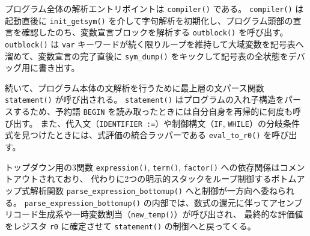 \documentclass[11pt,a4paper,dvipdfmx]{bxjsarticle}
\begin{document}
プログラム全体の解析エントリポイントは \texttt{compiler()} である。
\texttt{compiler()} は起動直後に \texttt{init\_getsym()} を介して字句解析を初期化し、プログラム頭部の宣言を確認したのち、変数宣言ブロックを解析する \texttt{outblock()} を呼び出す。
\texttt{outblock()} は \texttt{var} キーワードが続く限りループを維持して大域変数を記号表へ溜めて、変数宣言の完了直後に \texttt{sym\_dump()} をキックして記号表の全状態をデバッグ用に書き出す。

続いて、プログラム本体の文解析を行うために最上層の文パース関数 \texttt{statement()} が呼び出される。
\texttt{statement()} はプログラムの入れ子構造をパースするため、予約語 \texttt{BEGIN} を読み取ったときには自分自身を再帰的に何度も呼び出す。
また、代入文（\texttt{IDENTIFIER :=}）や制御構文（\texttt{IF}, \texttt{WHILE}）の分岐条件式を見つけたときには、式評価の統合ラッパーである \texttt{eval\_to\_r0()} を呼び出す。

トップダウン用の3関数 \texttt{expression()}, \texttt{term()}, \texttt{factor()} への依存関係はコメントアウトされており、
代わりに2つの明示的スタックをループ制御するボトムアップ式解析関数 \texttt{parse\_expression\_bottomup()} へと制御が一方向へ委ねられる。
\texttt{parse\_expression\_bottomup()} の内部では、数式の還元に伴ってアセンブリコード生成系や一時変数割当（\texttt{new\_temp()}）が呼び出され、
最終的な評価値をレジスタ \texttt{r0} に確定させて \texttt{statement()} の制御へと戻ってくる。
\end{document}
